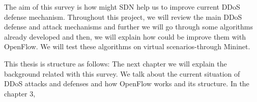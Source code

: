 The aim of this survey is how might SDN help us to improve current DDoS defense mechanism. Throughout this project, we will review the main DDoS defense and attack mechanisms and further we will go through some algorithms already developed and then, we will explain how could be improve them with OpenFlow. We will test these algorithms on virtual scenarios-through Mininet.

\bigskip

This thesis is structure as follows: The next chapter we will explain the background related with this survey. We talk about the current situation of DDoS attacks and defenses and how OpenFlow works and its structure. In the chapter 3, 



